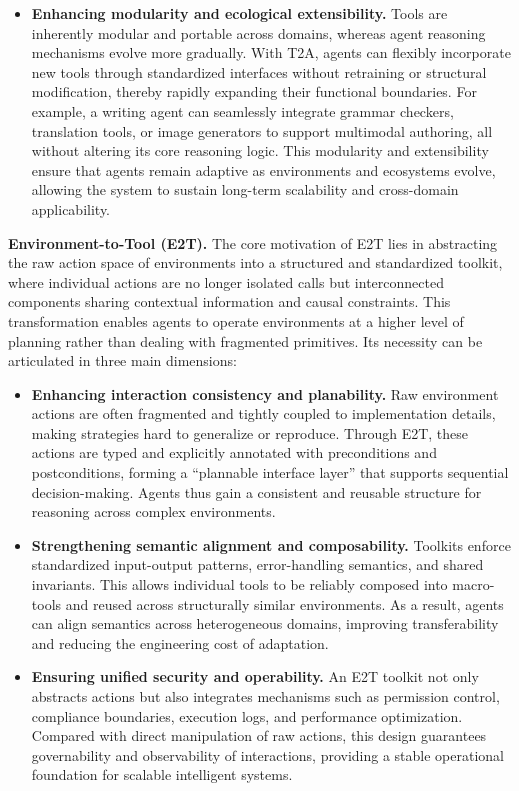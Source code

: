 \documentclass[11pt]{article}
\begin{document}
\begin{itemize}[leftmargin=*, itemsep=0.4em]
  \item \textbf{Enhancing modularity and ecological extensibility.}  
  Tools are inherently modular and portable across domains, whereas agent reasoning mechanisms evolve more gradually. With T2A, agents can flexibly incorporate new tools through standardized interfaces without retraining or structural modification, thereby rapidly expanding their functional boundaries. For example, a writing agent can seamlessly integrate grammar checkers, translation tools, or image generators to support multimodal authoring, all without altering its core reasoning logic. This modularity and extensibility ensure that agents remain adaptive as environments and ecosystems evolve, allowing the system to sustain long-term scalability and cross-domain applicability.  

\end{itemize}  

\textbf{Environment-to-Tool (E2T).} The core motivation of E2T lies in abstracting the raw action space of environments into a structured and standardized toolkit, where individual actions are no longer isolated calls but interconnected components sharing contextual information and causal constraints. This transformation enables agents to operate environments at a higher level of planning rather than dealing with fragmented primitives. Its necessity can be articulated in three main dimensions:  

\begin{itemize}[leftmargin=*,itemsep=0.1em]
  \item \textbf{Enhancing interaction consistency and planability.}  
  Raw environment actions are often fragmented and tightly coupled to implementation details, making strategies hard to generalize or reproduce. Through E2T, these actions are typed and explicitly annotated with preconditions and postconditions, forming a ``plannable interface layer'' that supports sequential decision-making. Agents thus gain a consistent and reusable structure for reasoning across complex environments.  

  \item \textbf{Strengthening semantic alignment and composability.}  
  Toolkits enforce standardized input-output patterns, error-handling semantics, and shared invariants. This allows individual tools to be reliably composed into macro-tools and reused across structurally similar environments. As a result, agents can align semantics across heterogeneous domains, improving transferability and reducing the engineering cost of adaptation.  

  \item \textbf{Ensuring unified security and operability.}  
  An E2T toolkit not only abstracts actions but also integrates mechanisms such as permission control, compliance boundaries, execution logs, and performance optimization. Compared with direct manipulation of raw actions, this design guarantees governability and observability of interactions, providing a stable operational foundation for scalable intelligent systems.  
\end{itemize}
\end{document}
